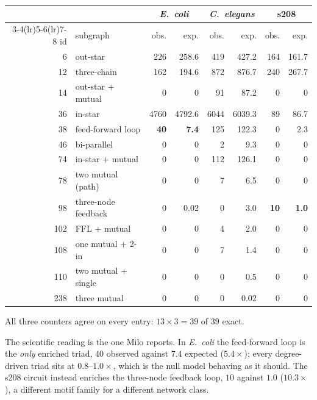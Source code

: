 \documentclass[11pt]{article}
\begin{document}
\begin{center}
\begin{tabular}{r l rr rr rr}
\toprule
& & \multicolumn{2}{c}{\textit{E.\ coli}} & \multicolumn{2}{c}{\textit{C.\ elegans}} & \multicolumn{2}{c}{s208} \\
\cmidrule(lr){3-4}\cmidrule(lr){5-6}\cmidrule(lr){7-8}
id & subgraph & obs. & exp. & obs. & exp. & obs. & exp. \\
\midrule
6   & out-star            & 226  & 258.6  & 419  & 427.2  & 164 & 161.7 \\
12  & three-chain         & 162  & 194.6  & 872  & 876.7  & 240 & 267.7 \\
14  & out-star + mutual   & 0    & 0      & 91   & 87.2   & 0   & 0     \\
36  & in-star             & 4760 & 4792.6 & 6044 & 6039.3 & 89  & 86.7  \\
38  & feed-forward loop   & \textbf{40} & \textbf{7.4} & 125 & 122.3 & 0 & 2.3 \\
46  & bi-parallel         & 0    & 0      & 2    & 9.3    & 0   & 0     \\
74  & in-star + mutual    & 0    & 0      & 112  & 126.1  & 0   & 0     \\
78  & two mutual (path)   & 0    & 0      & 7    & 6.5    & 0   & 0     \\
98  & three-node feedback & 0    & 0.02   & 0    & 3.0    & \textbf{10} & \textbf{1.0} \\
102 & FFL + mutual        & 0    & 0      & 4    & 2.0    & 0   & 0     \\
108 & one mutual + 2-in   & 0    & 0      & 7    & 1.4    & 0   & 0     \\
110 & two mutual + single & 0    & 0      & 0    & 0.5    & 0   & 0     \\
238 & three mutual        & 0    & 0      & 0    & 0.02   & 0   & 0     \\
\bottomrule
\end{tabular}
\end{center}

All three counters agree on every entry: $13\times3=39$ of $39$ exact.

The scientific reading is the one Milo reports. In \textit{E.\ coli} the
feed-forward loop is the \emph{only} enriched triad, $40$ observed against
$7.4$ expected ($5.4\times$); every degree-driven triad sits at $0.8$--$1.0\times$,
which is the null model behaving as it should. The s208 circuit instead enriches
the three-node feedback loop, $10$ against $1.0$ ($10.3\times$), a different
motif family for a different network class.
\end{document}
